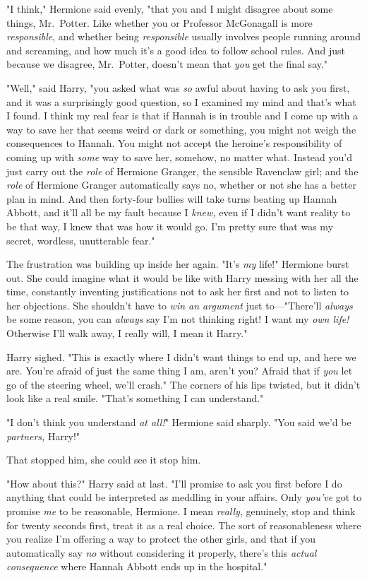 "I think," Hermione said evenly, "that you and I might disagree about some
things, Mr.~Potter. Like whether you or Professor McGonagall is more
\emph{responsible}, and whether being \emph{responsible} usually involves
people running around and screaming, and how much it's a good idea to follow
school rules. And just because we disagree, Mr.~Potter, doesn't mean that
\emph{you} get the final say."

"Well," said Harry, "you asked what was \emph{so} awful about having to ask you
first, and it was a surprisingly good question, so I examined my mind and
that's what I found. I think my real fear is that if Hannah is in trouble and I
come up with a way to save her that seems weird or dark or something, you might
not weigh the consequences to Hannah. You might not accept the heroine's
responsibility of coming up with \emph{some} way to save her, somehow, no
matter what. Instead you'd just carry out the \emph{role} of Hermione Granger,
the sensible Ravenclaw girl; and the \emph{role} of Hermione Granger
automatically says no, whether or not she has a better plan in mind. And then
forty-four bullies will take turns beating up Hannah Abbott, and it'll all be
my fault because I \emph{knew,} even if I didn't want reality to be that way, I
knew that was how it would go. I'm pretty sure that was my secret, wordless,
unutterable fear."

The frustration was building up inside her again. "It's \emph{my} life!"
Hermione burst out. She could imagine what it would be like with Harry messing
with her all the time, constantly inventing justifications not to ask her first
and not to listen to her objections. She shouldn't have to \emph{win an
argument} just to---"There'll \emph{always} be some reason, you can
\emph{always} say I'm not thinking right! I want my \emph{own life!} Otherwise
I'll walk away, I really will, I mean it Harry."

Harry sighed. "This is exactly where I didn't want things to end up, and here
we are. You're afraid of just the same thing I am, aren't you? Afraid that if
\emph{you} let go of the steering wheel, we'll crash." The corners of his lips
twisted, but it didn't look like a real smile. "That's something I can
understand."

"I don't think you understand \emph{at all!}" Hermione said sharply. "You said
we'd be \emph{partners,} Harry!"

That stopped him, she could see it stop him.

"How about this?" Harry said at last. "I'll promise to ask you first before I
do anything that could be interpreted as meddling in your affairs. Only
\emph{you've} got to promise \emph{me} to be reasonable, Hermione. I mean
\emph{really}, genuinely, stop and think for twenty seconds first, treat it as
a real choice. The sort of reasonableness where you realize I'm offering a way
to protect the other girls, and that if you automatically say \emph{no} without
considering it properly, there's this \emph{actual consequence} where Hannah
Abbott ends up in the hospital."

